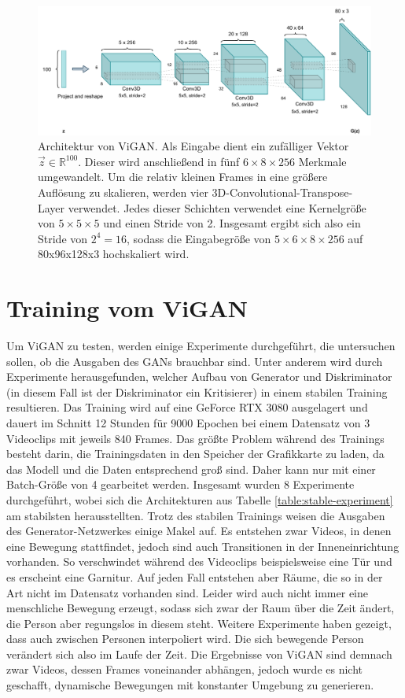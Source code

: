 \begin{figure}
    \centering
    \includegraphics[width=\textwidth]{images/ViGAN.pdf}
    \caption{Architektur von ViGAN. Als Eingabe dient ein zufälliger Vektor $\vec{z}
    \in \mathbb{R}^{100}$. Dieser wird anschließend in fünf $6 \times 8 \times
    256$ Merkmale umgewandelt. Um die relativ kleinen Frames in eine größere
    Auflösung zu skalieren, werden vier 3D-Convolutional-Transpose-Layer verwendet. Jedes
    dieser Schichten verwendet eine Kernelgröße von $5 \times 5 \times 5$ und
    einen Stride von 2.  Insgesamt ergibt sich also ein Stride von $2^4 = 16$,
    sodass die Eingabegröße von $5 \times 6 \times 8 \times 256$ auf 80x96x128x3
    hochskaliert wird.}
    \label{fig:vigan}
\end{figure}

\section{Training vom ViGAN}
Um ViGAN zu testen, werden einige Experimente durchgeführt, die untersuchen
sollen, ob die Ausgaben des GANs brauchbar sind. Unter anderem wird durch
Experimente herausgefunden, welcher Aufbau von Generator und Diskriminator (in
diesem Fall ist der Diskriminator ein Kritisierer) in einem stabilen Training
resultieren. Das Training wird auf eine GeForce RTX 3080 ausgelagert und dauert
im Schnitt 12 Stunden für 9000 Epochen bei einem Datensatz von 3 Videoclips mit
jeweils 840 Frames. Das größte Problem während des Trainings besteht darin, die
Trainingsdaten in den Speicher der Grafikkarte zu laden, da das Modell und die
Daten entsprechend groß sind. Daher kann nur mit einer Batch-Größe von 4
gearbeitet werden. Insgesamt wurden 8 Experimente durchgeführt, wobei sich die
Architekturen aus Tabelle \ref{table:stable-experiment} am stabilsten
herausstellten. Trotz des stabilen Trainings weisen die Ausgaben des
Generator-Netzwerkes einige Makel auf. Es entstehen zwar Videos, in denen eine
Bewegung stattfindet, jedoch sind auch Transitionen in der Inneneinrichtung
vorhanden. So verschwindet während des Videoclips beispielsweise eine Tür und es
erscheint eine Garnitur. Auf jeden Fall entstehen aber Räume, die so in der Art
nicht im Datensatz vorhanden sind. Leider wird auch nicht immer eine menschliche
Bewegung erzeugt, sodass sich zwar der Raum über die Zeit ändert, die Person
aber regungslos in diesem steht. Weitere Experimente haben gezeigt, dass auch
zwischen Personen interpoliert wird. Die sich bewegende Person verändert sich
also im Laufe der Zeit. Die Ergebnisse von ViGAN sind demnach zwar Videos,
dessen Frames voneinander abhängen, jedoch wurde es nicht geschafft, dynamische
Bewegungen mit konstanter Umgebung zu generieren.

